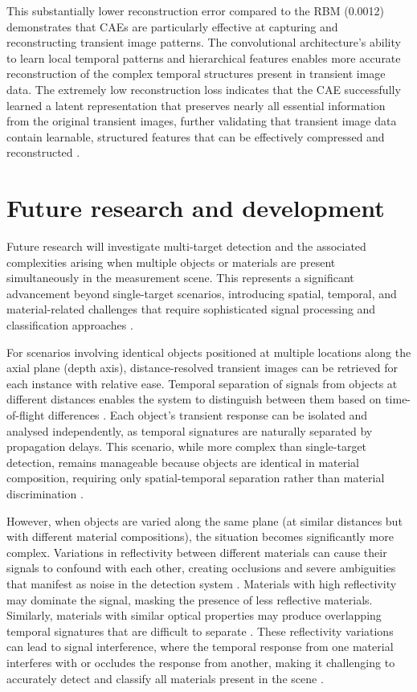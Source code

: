 \documentclass[12pt,a4paper,oneside]{report}
\let\oldsection\section
\renewcommand{\section}{\clearpage\oldsection}
\begin{document}
This substantially lower reconstruction error compared to the RBM (0.0012) demonstrates that CAEs are particularly effective at capturing and reconstructing transient image patterns. The convolutional architecture's ability to learn local temporal patterns and hierarchical features enables more accurate reconstruction of the complex temporal structures present in transient image data. The extremely low reconstruction loss indicates that the CAE successfully learned a latent representation that preserves nearly all essential information from the original transient images, further validating that transient image data contain learnable, structured features that can be effectively compressed and reconstructed \cite{su2016,tontini2020}.

\section{Future research and development}
\label{sec:future_rd}

Future research will investigate multi-target detection and the associated complexities arising when multiple objects or materials are present simultaneously in the measurement scene. This represents a significant advancement beyond single-target scenarios, introducing spatial, temporal, and material-related challenges that require sophisticated signal processing and classification approaches \cite{su2016,becker2023}.

For scenarios involving identical objects positioned at multiple locations along the axial plane (depth axis), distance-resolved transient images can be retrieved for each instance with relative ease. Temporal separation of signals from objects at different distances enables the system to distinguish between them based on time-of-flight differences \cite{koerner2021}. Each object's transient response can be isolated and analysed independently, as temporal signatures are naturally separated by propagation delays. This scenario, while more complex than single-target detection, remains manageable because objects are identical in material composition, requiring only spatial-temporal separation rather than material discrimination \cite{tontini2020,koerner2021}.

However, when objects are varied along the same plane (at similar distances but with different material compositions), the situation becomes significantly more complex. Variations in reflectivity between different materials can cause their signals to confound with each other, creating occlusions and severe ambiguities that manifest as noise in the detection system \cite{heinz2001,tontini2024}. Materials with high reflectivity may dominate the signal, masking the presence of less reflective materials. Similarly, materials with similar optical properties may produce overlapping temporal signatures that are difficult to separate \cite{su2016,becker2023}. These reflectivity variations can lead to signal interference, where the temporal response from one material interferes with or occludes the response from another, making it challenging to accurately detect and classify all materials present in the scene \cite{heinz2001,schott2007}.
\end{document}
